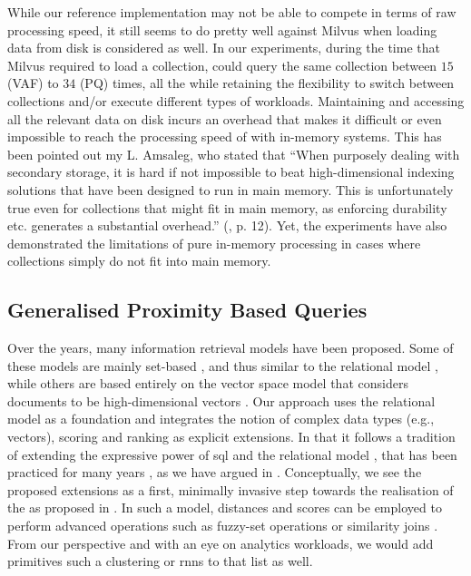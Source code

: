 While our reference implementation \cottontail{} may not be able to compete in terms of raw processing speed, it still seems to do pretty well against Milvus when loading data from disk is considered as well. In our experiments, during the time that Milvus required to load a collection, \cottontail{} could query the same collection between $15$ (VAF) to $34$ (PQ) times, all the while retaining the flexibility to switch between collections and/or execute different types of workloads. Maintaining and accessing all the relevant data on disk incurs an overhead that makes it difficult or even impossible to reach the processing speed of with in-memory systems. This has been pointed out my L. Amsaleg, who stated that ``When purposely dealing with secondary storage, it is hard if not impossible to beat high-dimensional indexing solutions that have been designed to run in main memory. This is unfortunately true even for collections that might fit in main memory, as enforcing durability etc. generates a substantial overhead.'' (\cite{Amsaleg:2014Database}, p. 12). Yet, the experiments have also demonstrated the limitations of pure in-memory processing in cases where collections simply do not fit into main memory.

\subsection{Generalised Proximity Based Queries}

Over the years, many information retrieval models \cite{Umano:1983Retrieval,Salton:1983Extended,Wong:1985Generalized} have been proposed. Some of these models are mainly set-based \cite{Salton:1983Extended,Umano:1983Retrieval}, and thus similar to the relational model \cite{Codd:1970Relational}, while others are based entirely on the vector space model that considers documents to be high-dimensional vectors \cite{Wong:1985Generalized}. Our approach uses the relational model as a foundation and integrates the notion of complex data types (e.g., vectors), scoring and ranking as explicit extensions. In that it follows a tradition of extending the expressive power of \acrshort{sql} and the relational model \cite{Libkin:2003Expressive}, that has been practiced for many years \cite{Chengkai:2005RankSQL,Zhang:2006Boolean,Belohlavek:2007Relational}, as we have argued in . Conceptually, we see the proposed extensions as a first, minimally invasive step towards the realisation of the \cite{Extended Boolean Retrieval Model} as proposed in \cite{Salton:1983Extended}. In such a model, distances and scores can be employed to perform advanced operations such as fuzzy-set operations or similarity joins \cite{Umano:1983Retrieval,Zadeh:1996Fuzzy,Bohm:2001Fast}. From our perspective and with an eye on analytics workloads, we would add primitives such a clustering or \acrshort{rnns} to that list as well.

